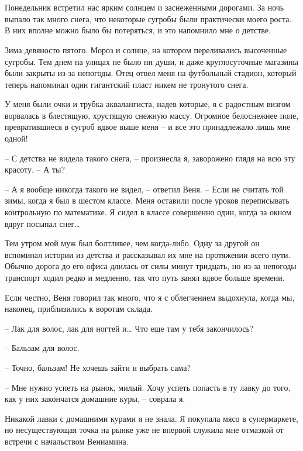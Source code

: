 \documentclass[
]{book}
\begin{document}
\hypertarget{chapter-82}{%
\chapter{~}\label{chapter-82}}

Понедельник встретил нас ярким солнцем и заснеженными дорогами. За ночь выпало так много снега, что некоторые сугробы были практически моего роста. В них вполне можно было бы потеряться, и это напомнило мне о детстве.

Зима девяносто пятого. Мороз и солнце, на котором переливались высоченные сугробы. Тем днем на улицах не было ни души, и даже круглосуточные магазины были закрыты из-за непогоды. Отец отвел меня на футбольный стадион, который теперь напоминал один гигантский пласт никем не тронутого снега.

У меня были очки и трубка аквалангиста, надев которые, я с радостным визгом ворвалась в блестящую, хрустящую снежную массу. Огромное белоснежнее поле, превратившиеся в сугроб вдвое выше меня -- и все это принадлежало лишь мне одной!

-- С детства не видела такого снега, -- произнесла я, заворожено глядя на всю эту красоту. -- А ты?

-- А я вообще никогда такого не видел, -- ответил Веня. -- Если не считать той зимы, когда я был в шестом классе. Меня оставили после уроков переписывать контрольную по математике. Я сидел в классе совершенно один, когда за окном вдруг посыпал снег\ldots{}

Тем утром мой муж был болтливее, чем когда-либо. Одну за другой он вспоминал истории из детства и рассказывал их мне на протяжении всего пути. Обычно дорога до его офиса длилась от силы минут тридцать, но из-за непогоды транспорт ходил редко и медленно, так что путь занял вдвое больше времени.

Если честно, Веня говорил так много, что я с облегчением выдохнула, когда мы, наконец, приблизились к воротам склада.

-- Лак для волос, лак для ногтей и\ldots{} Что еще там у тебя закончилось?

-- Бальзам для волос.

-- Точно, бальзам! Не хочешь зайти и выбрать сама?

-- Мне нужно успеть на рынок, милый. Хочу успеть попасть в ту лавку до того, как у них закончатся домашние куры, -- соврала я.

Никакой лавки с домашними курами я не знала. Я покупала мясо в супермаркете, но несуществующая точка на рынке уже не впервой служила мне отмазкой от встречи с начальством Вениамина.
\end{document}
